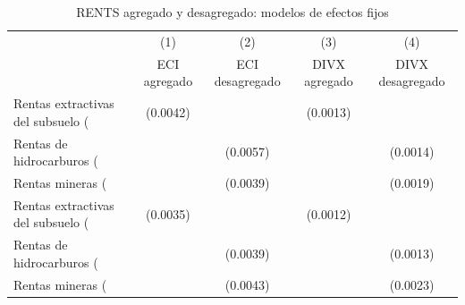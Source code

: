 \begin{table}[htbp]\centering
\def\sym#1{\ifmmode^{#1}\else\(^{#1}\)\fi}
\caption{RENTS agregado y desagregado: modelos de efectos fijos}
\begin{tabular}{l*{4}{c}}
\toprule
                    &\multicolumn{1}{c}{(1)}&\multicolumn{1}{c}{(2)}&\multicolumn{1}{c}{(3)}&\multicolumn{1}{c}{(4)}\\
                    &\multicolumn{1}{c}{ECI agregado}&\multicolumn{1}{c}{ECI desagregado}&\multicolumn{1}{c}{DIVX agregado}&\multicolumn{1}{c}{DIVX desagregado}\\
\midrule
Rentas extractivas del subsuelo (%
                    &    (0.0042)         &                     &    (0.0013)         &                     \\
\addlinespace
Rentas de hidrocarburos (%
                    &                     &    (0.0057)         &                     &    (0.0014)         \\
\addlinespace
Rentas mineras (%
                    &                     &    (0.0039)         &                     &    (0.0019)         \\
\addlinespace
Rentas extractivas del subsuelo (%
                    &    (0.0035)         &                     &    (0.0012)         &                     \\
\addlinespace
Rentas de hidrocarburos (%
                    &                     &    (0.0039)         &                     &    (0.0013)         \\
\addlinespace
Rentas mineras (%
                    &                     &    (0.0043)         &                     &    (0.0023)         \\

\end{tabular}
\end{table}
